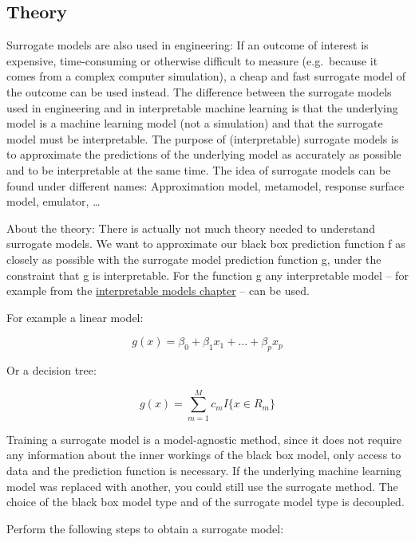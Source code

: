 \documentclass[
  11pt,
]{scrbook}
\begin{document}
\hypertarget{theory-4}{%
\subsection{Theory}\label{theory-4}}

Surrogate models are also used in engineering:
If an outcome of interest is expensive, time-consuming or otherwise difficult to measure (e.g.~because it comes from a complex computer simulation), a cheap and fast surrogate model of the outcome can be used instead.
The difference between the surrogate models used in engineering and in interpretable machine learning is that the underlying model is a machine learning model (not a simulation) and that the surrogate model must be interpretable.
The purpose of (interpretable) surrogate models is to approximate the predictions of the underlying model as accurately as possible and to be interpretable at the same time.
The idea of surrogate models can be found under different names:
Approximation model, metamodel, response surface model, emulator, \ldots{}

About the theory:
There is actually not much theory needed to understand surrogate models.
We want to approximate our black box prediction function f as closely as possible with the surrogate model prediction function g, under the constraint that g is interpretable.
For the function g any interpretable model -- for example from the \protect\hyperlink{simple}{interpretable models chapter} -- can be used.

For example a linear model:

\[g(x)=\beta_0+\beta_1{}x_1{}+\ldots+\beta_p{}x_p\]

Or a decision tree:

\[g(x)=\sum_{m=1}^Mc_m{}I\{x\in{}R_m\}\]

Training a surrogate model is a model-agnostic method, since it does not require any information about the inner workings of the black box model, only access to data and the prediction function is necessary.
If the underlying machine learning model was replaced with another, you could still use the surrogate method.
The choice of the black box model type and of the surrogate model type is decoupled.

Perform the following steps to obtain a surrogate model:
\end{document}
